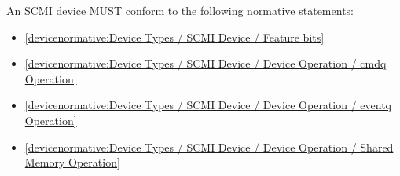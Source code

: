 \label{sec:Conformance / Device Conformance / SCMI Device Conformance}

An SCMI device MUST conform to the following normative statements:

\begin{itemize}
\item \ref{devicenormative:Device Types / SCMI Device / Feature bits}
\item \ref{devicenormative:Device Types / SCMI Device / Device Operation / cmdq Operation}
\item \ref{devicenormative:Device Types / SCMI Device / Device Operation / eventq Operation}
\item \ref{devicenormative:Device Types / SCMI Device / Device Operation / Shared Memory Operation}
\end{itemize}
